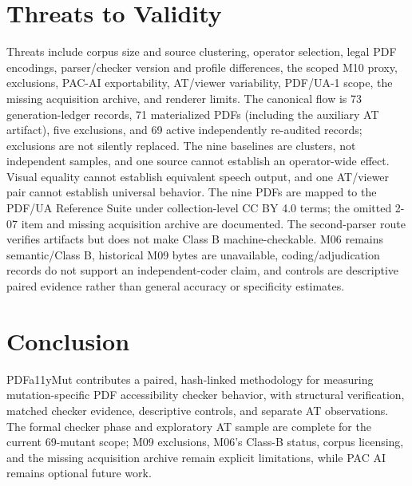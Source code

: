 \documentclass[conference]{IEEEtran}
\newcommand{\taggedsection}[1]{%
  \tagstructbegin{tag=H1}\tagmcbegin{tag=H1}\section{#1}\tagmcend\tagstructend}
\newenvironment{taggedparagraph}{%
  \tagstructbegin{tag=P}\tagmcbegin{tag=P}%
}{%
  \tagmcend\tagstructend%
}
\begin{document}
\taggedsection{Threats to Validity}
\begin{taggedparagraph}
Threats include corpus size and source clustering, operator selection, legal PDF encodings, parser/checker version and profile differences, the scoped M10 proxy, exclusions, PAC-AI exportability, AT/viewer variability, PDF/UA-1 scope, the missing acquisition archive, and renderer limits. The canonical flow is 73 generation-ledger records, 71 materialized PDFs (including the auxiliary AT artifact), five exclusions, and 69 active independently re-audited records; exclusions are not silently replaced. The nine baselines are clusters, not independent samples, and one source cannot establish an operator-wide effect. Visual equality cannot establish equivalent speech output, and one AT/viewer pair cannot establish universal behavior. The nine PDFs are mapped to the PDF/UA Reference Suite under collection-level CC BY 4.0 terms; the omitted 2-07 item and missing acquisition archive are documented. The second-parser route verifies artifacts but does not make Class B machine-checkable. M06 remains semantic/Class B, historical M09 bytes are unavailable, coding/adjudication records do not support an independent-coder claim, and controls are descriptive paired evidence rather than general accuracy or specificity estimates.
\end{taggedparagraph}

\taggedsection{Conclusion}
\begin{taggedparagraph}
PDFa11yMut contributes a paired, hash-linked methodology for measuring mutation-specific PDF accessibility checker behavior, with structural verification, matched checker evidence, descriptive controls, and separate AT observations. The formal checker phase and exploratory AT sample are complete for the current 69-mutant scope; M09 exclusions, M06's Class-B status, corpus licensing, and the missing acquisition archive remain explicit limitations, while PAC AI remains optional future work.
\end{taggedparagraph}
\end{document}
